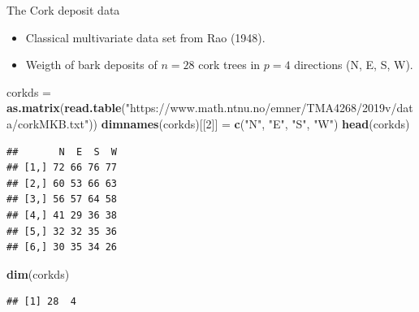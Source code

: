 \documentclass[ignorenonframetext,]{beamer}
\newenvironment{Shaded}{\begin{snugshade}}{\end{snugshade}}
\newcommand{\KeywordTok}[1]{\textcolor[rgb]{0.13,0.29,0.53}{\textbf{#1}}}
\newcommand{\DecValTok}[1]{\textcolor[rgb]{0.00,0.00,0.81}{#1}}
\newcommand{\StringTok}[1]{\textcolor[rgb]{0.31,0.60,0.02}{#1}}
\newcommand{\NormalTok}[1]{#1}
\providecommand{\tightlist}{%
  \setlength{\itemsep}{0pt}\setlength{\parskip}{0pt}}
\begin{document}
\begin{frame}[fragile]

\begin{block}{The Cork deposit data}

\begin{itemize}
\tightlist
\item
  Classical multivariate data set from Rao (1948).
\item
  Weigth of bark deposits of \(n=28\) cork trees in \(p=4\) directions
  (N, E, S, W).
\end{itemize}

\tiny

\begin{Shaded}
\begin{Highlighting}[]
\NormalTok{corkds =}\StringTok{ }\KeywordTok{as.matrix}\NormalTok{(}\KeywordTok{read.table}\NormalTok{(}\StringTok{"https://www.math.ntnu.no/emner/TMA4268/2019v/data/corkMKB.txt"}\NormalTok{))}
\KeywordTok{dimnames}\NormalTok{(corkds)[[}\DecValTok{2}\NormalTok{]] =}\StringTok{ }\KeywordTok{c}\NormalTok{(}\StringTok{"N"}\NormalTok{, }\StringTok{"E"}\NormalTok{, }\StringTok{"S"}\NormalTok{, }\StringTok{"W"}\NormalTok{)}
\KeywordTok{head}\NormalTok{(corkds)}
\end{Highlighting}
\end{Shaded}

\begin{verbatim}
##       N  E  S  W
## [1,] 72 66 76 77
## [2,] 60 53 66 63
## [3,] 56 57 64 58
## [4,] 41 29 36 38
## [5,] 32 32 35 36
## [6,] 30 35 34 26
\end{verbatim}

\begin{Shaded}
\begin{Highlighting}[]
\KeywordTok{dim}\NormalTok{(corkds)}
\end{Highlighting}
\end{Shaded}

\begin{verbatim}
## [1] 28  4
\end{verbatim}

\end{block}

\end{frame}
\end{document}
